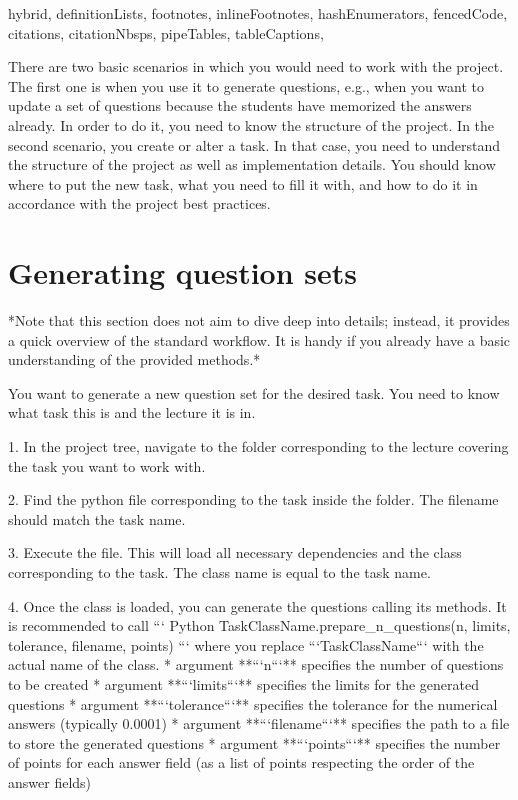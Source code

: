 \documentclass[
  digital, %
  table,   %
  twoside, %
  nolof,     %
  nolot,     %
  draft=false,
  final,
]{fithesis3}
\begin{document}
\shorthandoff{-}
\begin{markdown*}{%
  hybrid,
  definitionLists,
  footnotes,
  inlineFootnotes,
  hashEnumerators,
  fencedCode,
  citations,
  citationNbsps,
  pipeTables,
  tableCaptions,
}

There are two basic scenarios in which you would need to work with the project. The first one is when you use it to generate questions, e.g., when you want to update a set of questions because the students have memorized the answers already. In order to do it, you need to know the structure of the project. In the second scenario, you create or alter a task. In that case, you need to understand the structure of the project as well as implementation details. You should know where to put the new task, what you need to fill it with, and how to do it in accordance with the project best practices. 

\section{Generating question sets}

*Note that this section does not aim to dive deep into details; instead, it provides a quick overview of the standard workflow. It is handy if you already have a basic understanding of the provided methods.*

You want to generate a new question set for the desired task. You need to know what task this is and the lecture it is in. 

1. In the project tree, navigate to the folder corresponding to the lecture covering the task you want to work with.
    
2. Find the python file corresponding to the task inside the folder. The filename should match the task name.
    
3. Execute the file. This will load all necessary dependencies and the class corresponding to the task. The class name is equal to the task name. 
    
4. Once the class is loaded, you can generate the questions calling its methods. It is recommended to call
``` Python
    TaskClassName.prepare_n_questions(n,  limits, tolerance, filename, points)
```
where you replace ```TaskClassName``` with the actual name of the class. 
    * argument **```n```** specifies the number of questions to be created
    * argument **```limits```** specifies the limits for the generated questions
    * argument **```tolerance```** specifies the tolerance for the numerical answers (typically 0.0001)
    * argument **```filename```** specifies the path to a file to store the generated questions
    * argument **```points```** specifies the number of points for each answer field (as a list of points respecting the order of the answer fields)
    

\end{markdown*}
\end{document}
